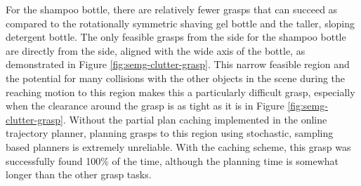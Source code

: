 For the shampoo bottle, there are relatively fewer grasps that can succeed as compared to the rotationally symmetric shaving gel bottle and the taller, sloping detergent bottle. The only feasible grasps from the side for the shampoo bottle are directly from the side, aligned with the wide axis of the bottle, as demonstrated in Figure \ref{fig:semg-clutter-grasp}. This narrow feasible region and the potential for many collisions with the other objects in the scene during the reaching motion to this region makes this a particularly difficult grasp, especially when the clearance around the grasp is as tight as it is in Figure \ref{fig:semg-clutter-grasp}. Without the partial plan caching implemented in the online trajectory planner, planning grasps to this region using stochastic, sampling based planners is extremely unreliable. With the caching scheme, this grasp was successfully found 100\% of the time, although the planning time is somewhat longer than the other grasp tasks.  

